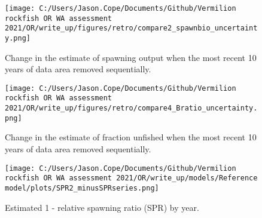 \documentclass[11pt,
  english,
  a4paper,
]{article}
\begin{document}
\begin{figure}
\centering
\texttt{[image: C:/Users/Jason.Cope/Documents/Github/Vermilion rockfish OR WA assessment 2021/OR/write\_up/figures/retro/compare2\_spawnbio\_uncertainty.png]}
\caption{Change in the estimate of spawning output when the most recent 10 years of data area removed sequentially.\label{fig:retro-ssb}}
\end{figure}

\tagmcend\tagstructend


\begin{figure}
\centering
\texttt{[image: C:/Users/Jason.Cope/Documents/Github/Vermilion rockfish OR WA assessment 2021/OR/write\_up/figures/retro/compare4\_Bratio\_uncertainty.png]}
\caption{Change in the estimate of fraction unfished when the most recent 10 years of data area removed sequentially.\label{fig:retro-depl}}
\end{figure}

\tagmcend\tagstructend

\newpage


\begin{figure}
\centering
\texttt{[image: C:/Users/Jason.Cope/Documents/Github/Vermilion rockfish OR WA assessment 2021/OR/write\_up/models/Reference model/plots/SPR2\_minusSPRseries.png]}
\caption{Estimated 1 - relative spawning ratio (SPR) by year.\label{fig:1-spr}}
\end{figure}

\tagmcend\tagstructend

\clearpage

\end{document}
